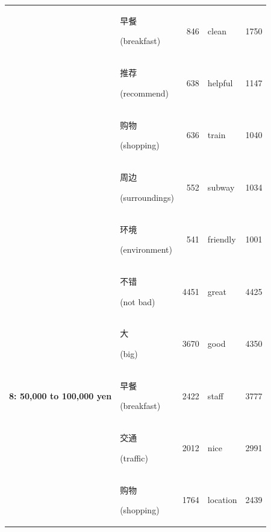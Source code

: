 \documentclass[smallextended,natbib]{svjour3}       %
\begin{document}
\begin{table}[ht]
{\begin{tabular}{|c|lr|lr|}
                                                             & \begin{CJK}{UTF8}{gbsn}早餐\end{CJK} (breakfast)       & 846   & clean       & 1750  \\  
                                                             & \begin{CJK}{UTF8}{gbsn}推荐\end{CJK} (recommend)       & 638   & helpful     & 1147  \\  
                                                             & \begin{CJK}{UTF8}{gbsn}购物\end{CJK} (shopping)        & 636   & train       & 1040  \\  
                                                             & \begin{CJK}{UTF8}{gbsn}周边\end{CJK} (surroundings)    & 552   & subway      & 1034  \\  
                                                             & \begin{CJK}{UTF8}{gbsn}环境\end{CJK} (environment)    & 541   & friendly    & 1001  \\ \hline
        \multirow{10}{*}{\textbf{8: 50,000 to 100,000 yen}}  & \begin{CJK}{UTF8}{gbsn}不错\end{CJK} (not bad)         & 4451  & great       & 4425  \\  
                                                             & \begin{CJK}{UTF8}{gbsn}大\end{CJK} (big)              & 3670  & good        & 4350  \\  
                                                             & \begin{CJK}{UTF8}{gbsn}早餐\end{CJK} (breakfast)       & 2422  & staff       & 3777  \\  
                                                             & \begin{CJK}{UTF8}{gbsn}交通\end{CJK} (traffic)         & 2012  & nice        & 2991  \\  
                                                             & \begin{CJK}{UTF8}{gbsn}购物\end{CJK} (shopping)        & 1764  & location    & 2439  \\  

\end{tabular}}
\end{table}
\end{document}
